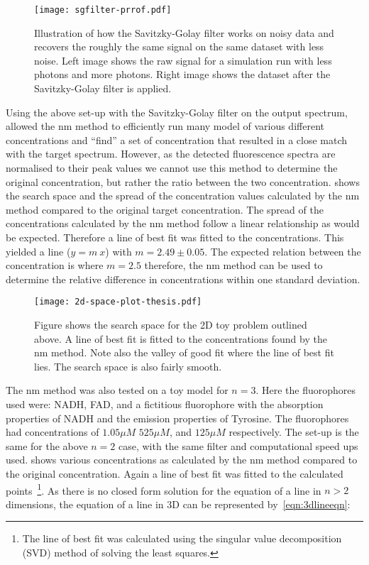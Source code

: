 \begin{figure}[!htbp]
  \centering
  \texttt{[image: sgfilter-prrof.pdf]}
  \caption{Illustration of how the Savitzky-Golay filter works on noisy data and recovers the roughly the same signal on the same dataset with less noise. Left image shows the raw signal for a simulation run with less photons and more photons. Right image shows the dataset after the Savitzky-Golay filter is applied.}
  \label{fig:sgfilter}
\end{figure}


Using the above set-up with the Savitzky-Golay filter on the output spectrum, allowed the \gls*{nm} method to efficiently run many model of various different concentrations and ``find'' a set of concentration that resulted in a close match with the target spectrum.
However, as the detected fluorescence spectra are normalised to their peak values we cannot use this method to determine the original concentration, but rather the ratio between the two concentration.
 shows the search space and the spread of the concentration values calculated by the \gls{nm} method compared to the original target concentration.
The spread of the concentrations calculated by the \gls*{nm} method follow a linear relationship as would be expected.
Therefore a line of best fit was fitted to the concentrations.
This yielded a line ($y=m\ x$) with $m=2.49\pm0.05$.
The expected relation between the concentration is where $m =2.5$ therefore, the \gls{nm} method can be used to determine the relative difference in concentrations within one standard deviation.


\begin{figure}[!htpb]
  \centering
  \texttt{[image: 2d-space-plot-thesis.pdf]}
  \caption{Figure shows the search space for the 2D toy problem outlined above. A line of best fit is fitted to the concentrations found by the \gls*{nm} method. Note also the valley of good fit where the line of best fit lies. The search space is also fairly smooth.}
  \label{fig:spaceplot2D}
\end{figure}


The \gls*{nm} method was also tested on a toy model for $n=3$.
Here the fluorophores used were: NADH, FAD, and a fictitious fluorophore with the absorption properties of NADH and the emission properties of Tyrosine.
The fluorophores had concentrations of $1.05\mu M$ $525\mu M$, and $125\mu M$ respectively.
The set-up is the same for the above $n=2$ case, with the same filter and computational speed ups used.
 shows various concentrations as calculated by the \gls*{nm} method compared to the original concentration.
Again a line of best fit was fitted to the calculated points~\footnote{The line of best fit was calculated using the singular value decomposition (SVD) method of solving the least squares.}.
As there is no closed form solution for the equation of a line in $n>2$ dimensions, the equation of a line in 3D can be represented by~\cref{eqn:3dlineeqn}:

